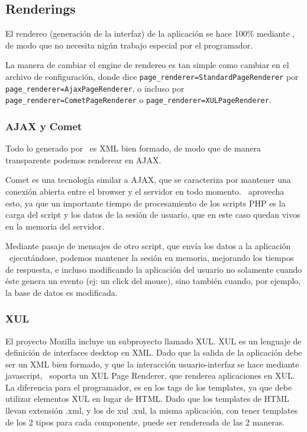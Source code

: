 \subsection{Renderings}
\label{sub-render}
El rendereo (generación de la interfaz) de la aplicación se hace 100\% mediante \PWB, de modo que no necesita nigún trabajo especial por el programador.

La manera de cambiar el engine de rendereo es tan simple como cambiar en el archivo de configuración, donde dice \verb"page_renderer=StandardPageRenderer" por \verb"page_renderer=AjaxPageRenderer", o incluso por \verb"page_renderer=CometPageRenderer" o \verb"page_renderer=XULPageRenderer".

\subsubsection{AJAX y Comet}

Todo lo generado por \PWB \ es XML bien formado, de modo que de manera transparente podemos renderear en AJAX.

Comet es una tecnología similar a AJAX, que se caracteriza por mantener una conexión abierta entre el browser y el servidor en todo momento. \PWB \ aprovecha esto, ya que un importante tiempo de procesamiento de los scripts PHP es la carga del script y los datos de la sesión de usuario, que en este caso quedan vivos en la memoria del servidor.

Mediante pasaje de mensajes de otro script, que envía los datos a la aplicación \PWB \ ejecutándose, podemos mantener la sesión en memoria, mejorando los tiempos de respuesta, e incluso modificando la aplicación del usuario no solamente cuando éste genera un evento (ej: un click del mouse), sino también cuando, por ejemplo, la base de datos es modificada.

\subsubsection{XUL}

El proyecto Mozilla incluye un subproyecto llamado XUL\cite{XUL}. XUL es un lenguaje de definición de interfaces desktop en XML. Dado que la salida de la aplicación debe ser un XML bien formado, y que la interacción usuario-interfaz se hace mediante javascript, \PWB \ soporta un XUL Page Renderer, que renderea aplicaciones en XUL. La diferencia para el programador, es en los tags de los templates, ya que debe utilizar elementos XUL en lugar de HTML. Dado que los templates de HTML llevan extensión .xml, y los de xul .xul, la misma aplicación, con tener templates de los 2 tipos para cada componente, puede ser rendereada de las 2 maneras.

